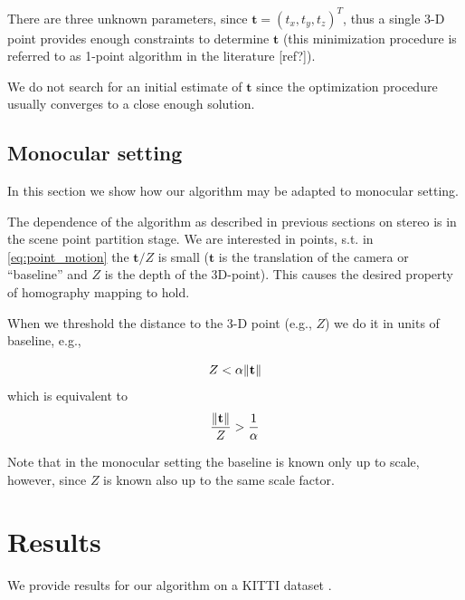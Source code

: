 \documentclass[runningheads]{llncs}
\DeclarePairedDelimiter{\norm}{\lVert}{\rVert}
\begin{document}
There are three unknown parameters, since $\mathbf{t} =
(t_x,t_y,t_z)^T$, thus a single 3-D point provides enough constraints
to determine $\mathbf{t}$ (this minimization procedure is referred to
as 1-point algorithm in the literature [ref?]).

We do not search for an initial estimate of $\mathbf{t}$ since the
optimization procedure usually converges to a close enough solution.

\subsection{Monocular setting}

In this section we show how our algorithm may be adapted to monocular
setting.

The dependence of the algorithm as described in previous sections on
stereo is in the scene point partition stage.  We are interested in
points, s.t. in \ref{eq:point_motion} the $\mathbf{t}/Z$ is small
($\mathbf{t}$ is the translation of the camera or ``baseline'' and $Z$
is the depth of the 3D-point). This causes the desired property of
homography mapping to hold.

When we threshold the distance to the 3-D point (e.g., $Z$) we do it
in units of baseline, e.g.,

\begin{equation}
Z<\alpha \norm{ \mathbf{t} }
\end{equation}
which is equivalent to
\begin{equation}
\frac{\norm{\mathbf{t}}}{Z} > \frac{1}{\alpha}
\end{equation}

Note that in the monocular setting the baseline is known only up to scale, however, since $Z$ is known also up to the same scale factor.
\section{Results}

We provide results for our algorithm on a KITTI dataset
\cite{Geiger2012}.
\end{document}
